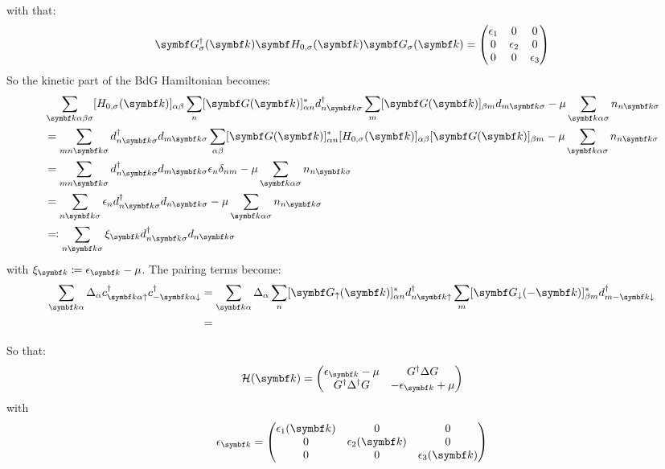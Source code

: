 \documentclass[../notes.tex]{subfiles}
\begin{document}
with that:
\begin{equation}
	\mat{G}^{\dagger}_{\sigma} (\vb{k}) \mat{H}_{0, \sigma} (\vb{k}) \mat{G}_{\sigma} (\vb{k}) =
	\begin{pmatrix}
		\epsilon_1 & 0 & 0 \\
		0 & \epsilon_2 & 0 \\
		0 & 0 & \epsilon_3
	\end{pmatrix}
\end{equation}
So the kinetic part of the BdG Hamiltonian becomes:
\begin{align}
	&\sum_{\vb{k} \alpha \beta \sigma} [H_{0, \sigma} (\vb{k})]_{\alpha \beta}
	\sum_{n} [\mat{G} (\vb{k})]_{\alpha n}^* d_{n \vb{k} \sigma}^{\dagger}
	\sum_{m} [\mat{G} (\vb{k})]_{\beta m} d_{m \vb{k} \sigma}
	-\mu \sum_{\vb{k} \alpha \sigma} n_{n \vb{k} \sigma} \\
	&= \sum_{m n \vb{k} \sigma} d_{n \vb{k} \sigma}^{\dagger} d_{m \vb{k} \sigma}
	\sum_{\alpha \beta} [\mat{G} (\vb{k})]_{\alpha n}^* [H_{0, \sigma} (\vb{k})]_{\alpha \beta} [\mat{G} (\vb{k})]_{\beta m}
	-\mu \sum_{\vb{k} \alpha \sigma} n_{n \vb{k} \sigma} \\
	&= \sum_{m n \vb{k} \sigma} d_{n \vb{k} \sigma}^{\dagger} d_{m \vb{k} \sigma} \epsilon_{n} \delta_{n m}
	-\mu \sum_{\vb{k} \alpha \sigma} n_{n \vb{k} \sigma} \\
	&= \sum_{n \vb{k} \sigma} \epsilon_{n} d_{n \vb{k} \sigma}^{\dagger} d_{n \vb{k} \sigma}
	-\mu \sum_{\vb{k} \alpha \sigma} n_{n \vb{k} \sigma} \\
	&\eqqcolon \sum_{n \vb{k} \sigma} \xi_{\vb{k}} d_{n \vb{k} \sigma}^{\dagger} d_{n \vb{k} \sigma}
\end{align}
with \(\xi_{\vb{k}} \coloneqq \epsilon_{\vb{k}} - \mu\).
The pairing terms become:
\begin{align}
	\sum_{\vb{k} \alpha} \Delta_{\alpha} c_{\vb{k} \alpha \uparrow}^{\dagger} c_{-\vb{k} \alpha \downarrow}^{\dagger}
	&= \sum_{\vb{k} \alpha} \Delta_{\alpha} \sum_n [\mat{G}_{\uparrow} (\vb{k})]_{\alpha n}^* d_{n \vb{k} \uparrow}^{\dagger} \sum_m [\mat{G}_{\downarrow} (-\vb{k})]_{\beta m}^* d_{m -\vb{k} \downarrow}^{\dagger} \\
	&=
\end{align}

So that:
\begin{equation}
	\mathcal{H} (\vb{k}) =
	\begin{pmatrix}
		\epsilon_{\vb{k}} - \mu & G^{\dagger} \Delta G\\
		G^{\dagger} \Delta^{\dagger} G & -\epsilon_{\vb{k}} + \mu
	\end{pmatrix}
\end{equation}
with
\begin{equation}
	\epsilon_{\vb{k}} =
	\begin{pmatrix}
		\epsilon_1 (\vb{k}) & 0 & 0 \\
		0 & \epsilon_2 (\vb{k}) & 0 \\
		0 & 0 & \epsilon_3 (\vb{k}) \\
	\end{pmatrix}
\end{equation}
\end{document}
